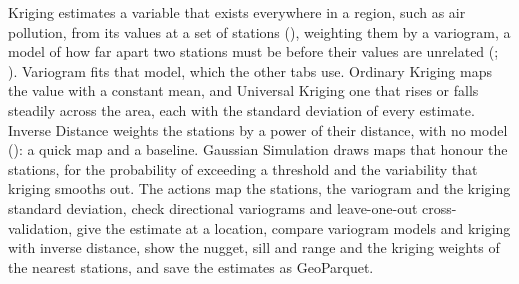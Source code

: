 Kriging estimates a variable that exists everywhere in a region, such as air pollution, from its values at a set of stations (), weighting them by a variogram, a model of how far apart two stations must be before their values are unrelated (; ). Variogram fits that model, which the other tabs use. Ordinary Kriging maps the value with a constant mean, and Universal Kriging one that rises or falls steadily across the area, each with the standard deviation of every estimate. Inverse Distance weights the stations by a power of their distance, with no model (): a quick map and a baseline. Gaussian Simulation draws maps that honour the stations, for the probability of exceeding a threshold and the variability that kriging smooths out. The actions map the stations, the variogram and the kriging standard deviation, check directional variograms and leave-one-out cross-validation, give the estimate at a location, compare variogram models and kriging with inverse distance, show the nugget, sill and range and the kriging weights of the nearest stations, and save the estimates as GeoParquet.


